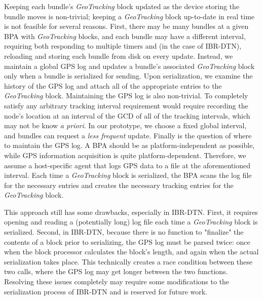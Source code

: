 Keeping each bundle's {\em GeoTracking} block updated as the device storing the bundle moves is non-trivial; keeping a {\em GeoTracking} block up-to-date in real time is not feasible for several reasons. First, there may be many bundles at a given BPA with {\em GeoTracking} blocks, and each bundle may have a different interval, requiring both responding to multiple timers and (in the case of IBR-DTN), reloading and storing each bundle from disk on every update. Instead, we maintain a global GPS log and updates a bundle's associated {\em GeoTracking} block only when a bundle is serialized for sending. Upon serialization, we examine the history of the GPS log and attach all of the appropriate entries to the {\em GeoTracking} block. Maintaining the GPS log is also non-trivial. To completely satisfy any arbitrary tracking interval requirement would require recording the node's location at an interval of the GCD of all of the tracking intervals, which may not be know {\em a priori}. In our prototype, we choose a fixed global interval, and bundles can request a {\em less frequent} update. Finally is the question of where to maintain the GPS log. A BPA should be as platform-independent as possible, while GPS information acquisition is quite platform-dependent. Therefore, we assume a host-specific agent that logs GPS data to a file at the aforementioned interval. Each time a {\em GeoTracking} block is serialized, the BPA scans the log file for the necessary entries and creates the necessary tracking entries for the {\em GeoTracking} block.

This approach still has some drawbacks, especially in IBR-DTN.  First, it requires opening and reading a (potentially long) log file each time a {\em GeoTracking} block is serialized.  Second, in IBR-DTN, because there is no function to "finalize" the contents of a block prior to serializing, the GPS log must be parsed twice: once when the block processor calculates the block's length, and again when the actual serialization takes place.  
This technically creates a race condition between these two calls, where the GPS log may get longer between the two functions.  Resolving these issues completely may require some modifications to the serialization process of IBR-DTN and is reserved for future work.

